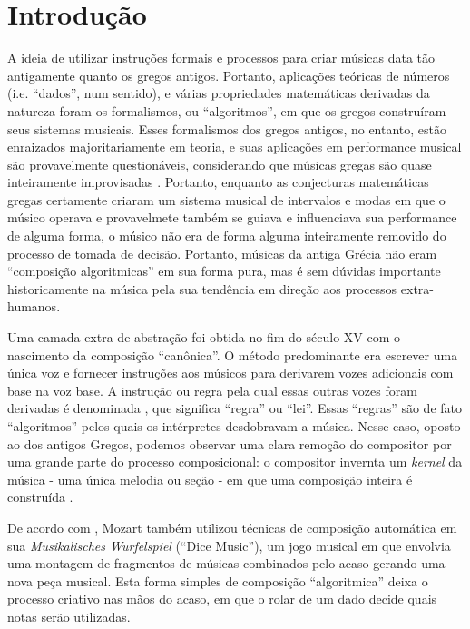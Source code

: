 \documentclass{automatextcc}
\begin{document}
\listoftables


\chapter{Introdução}

A ideia de utilizar instruções formais e processos para criar músicas data tão antigamente quanto os gregos antigos. Portanto, aplicações teóricas de números (i.e. ``dados'', num sentido), e várias propriedades matemáticas derivadas da natureza foram os formalismos, ou ``algoritmos'', em que os gregos construíram seus sistemas musicais. Esses formalismos dos gregos antigos, no entanto, estão enraizados majoritariamente em teoria, e suas aplicações em performance musical são provavelmente questionáveis, considerando que músicas gregas são quase inteiramente improvisadas \citep{grout1996}. Portanto, enquanto as conjecturas matemáticas gregas certamente criaram um sistema musical de intervalos e modas em que o músico operava e provavelmete também se guiava e influenciava sua performance de alguma forma, o músico não era de forma alguma inteiramente removido do processo de tomada de decisão. Portanto, músicas da antiga Grécia não eram ``composição algoritmicas'' em sua forma pura, mas é sem dúvidas importante historicamente na música pela sua tendência em direção aos processos extra-humanos.


Uma camada extra de abstração foi obtida no fim do século XV com o nascimento da composição ``canônica''. O método predominante era escrever uma única voz e fornecer instruções aos músicos para derivarem vozes adicionais com base na voz base. A instrução ou regra pela qual essas outras vozes foram derivadas é denominada , que significa ``regra'' ou ``lei''. Essas ``regras'' são de fato ``algoritmos'' pelos quais os intérpretes desdobravam a música. Nesse caso, oposto ao dos antigos Gregos, podemos observar uma clara remoção do compositor por uma grande parte do processo composicional: o compositor invernta um \textit{kernel} da música - uma única melodia ou seção - em que uma composição inteira é construída \citep{grout1996}. %


De acordo com \cite{alpern1995}, Mozart também utilizou técnicas de composição automática em sua \textit{Musikalisches Wurfelspiel} (``Dice Music''), um jogo musical em que envolvia uma montagem de fragmentos de músicas combinados pelo acaso gerando uma nova peça musical. Esta forma simples de composição ``algoritmica'' deixa o processo criativo nas mãos do acaso, em que o rolar de um dado decide quais notas serão utilizadas.
\end{document}
